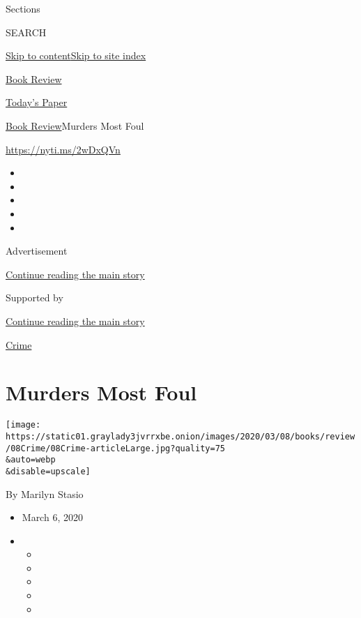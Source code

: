 Sections

SEARCH

\protect\hyperlink{site-content}{Skip to
content}\protect\hyperlink{site-index}{Skip to site index}

\href{https://www.nytimes3xbfgragh.onion/section/books/review}{Book
Review}

\href{https://myaccount.nytimes3xbfgragh.onion/auth/login?response_type=cookie\&client_id=vi}{}

\href{https://www.nytimes3xbfgragh.onion/section/todayspaper}{Today's
Paper}

\href{/section/books/review}{Book Review}\textbar{}Murders Most Foul

\url{https://nyti.ms/2wDxQVn}

\begin{itemize}
\item
\item
\item
\item
\item
\end{itemize}

Advertisement

\protect\hyperlink{after-top}{Continue reading the main story}

Supported by

\protect\hyperlink{after-sponsor}{Continue reading the main story}

\href{/column/crime}{Crime}

\hypertarget{murders-most-foul}{%
\section{Murders Most Foul}\label{murders-most-foul}}

\texttt{[image: https://static01.graylady3jvrrxbe.onion/images/2020/03/08/books/review/08Crime/08Crime-articleLarge.jpg?quality=75\\\&auto=webp\\\&disable=upscale]}

By Marilyn Stasio

\begin{itemize}
\item
  March 6, 2020
\item
  \begin{itemize}
  \item
  \item
  \item
  \item
  \item
  \end{itemize}
\end{itemize}

